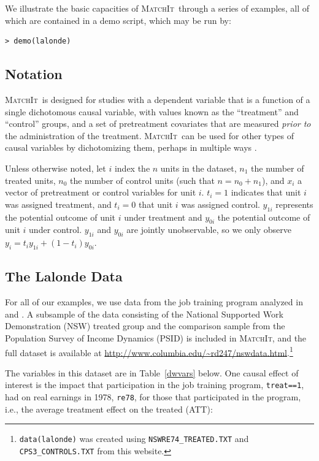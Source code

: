 \documentclass[oneside,letterpaper,titlepage]{article}
\newcommand{\MatchIt}{\textsc{MatchIt}}
\begin{document}
We illustrate the basic capacities of \MatchIt\ through a series of
examples, all of which are contained in a demo script, which may be
run by:

\begin{verbatim}
> demo(lalonde)
\end{verbatim}

\subsection{Notation}
\MatchIt\ is designed for studies with a dependent variable that is a
function of a single dichotomous causal variable, with values known as
the ``treatment'' and ``control'' groups, and a set of pretreatment
covariates that are measured {\it prior to} the administration of the
treatment.  \MatchIt\ can be used for other types of causal variables
by dichotomizing them, perhaps in multiple ways \citep[see
also][]{ImaDyk03}.

Unless otherwise noted, let $i$ index the $n$ units in the dataset,
$n_1$ the number of treated units, $n_0$ the number of control units
(such that $n=n_0+n_1$), and $x_i$ a vector of pretreatment or control
variables for unit $i$.  $t_i=1$ indicates that unit $i$ was assigned
treatment, and $t_i=0$ that unit $i$ was assigned control.  $y_{1i}$
represents the potential outcome of unit $i$ under treatment and
$y_{0i}$ the potential outcome of unit $i$ under control.  $y_{1i}$
and $y_{0i}$ are jointly unobservable, so we only observe
$y_i=t_iy_{1i}+(1-t_i)y_{0i}$.

\subsection{The Lalonde Data}
For all of our examples, we use data from the job training program
analyzed in \citet{lalonde86} and \citet{DehWah99}.  A subsample of
the data consisting of the National Supported Work Demonstration (NSW)
treated group and the comparison sample from the Population Survey of
Income Dynamics (PSID) is included in \MatchIt, and the full dataset
is available at
\url{http://www.columbia.edu/~rd247/nswdata.html}.\footnote{\texttt{data(lalonde)}
  was created using \texttt{NSWRE74\_TREATED.TXT} and
  \texttt{CPS3\_CONTROLS.TXT} from this website.}

The variables in this dataset are in Table~\ref{dwvars} below.  One
causal effect of interest is the impact that participation in the job
training program, \texttt{treat==1}, had on real earnings in 1978,
\texttt{re78}, for those that participated in the program, i.e., the
average treatment effect on the treated (ATT):
\end{document}
